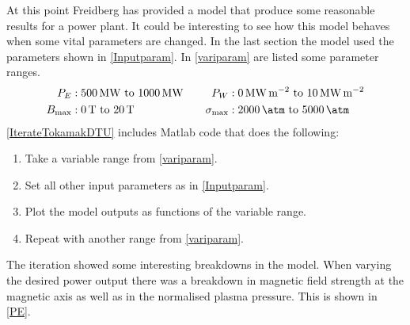 At this point Freidberg has provided a model that produce some reasonable results for a power plant. It could be interesting to see how this model behaves when some vital parameters are changed. In the last section the model used the parameters shown in \cref{Inputparam}. In \cref{variparam} are listed some parameter ranges.
\begin{alignat}{3}
	P_E &: \SIrange{500}{1000}{\mega\watt} & \quad P_W &: \SIrange{0}{10}{\mega\watt\per\meter\squared}\nonumber\\
	B_{\max} &: \SIrange{0}{20}{\tesla} & \quad \sigma_{\max} &: \SIrange{2000}{5000}{\atm}\label{variparam}
\end{alignat}
\cref{IterateTokamakDTU} includes Matlab code that does the following:
\begin{enumerate}
	\item Take a variable range from \cref{variparam}.
	\item Set all other input parameters as in \cref{Inputparam}.
	\item Plot the model outputs as functions of the variable range.
	\item Repeat with another range from \cref{variparam}.
\end{enumerate}
The iteration showed some interesting breakdowns in the model. When varying the desired power output there was a breakdown in magnetic field strength at the magnetic axis as well as in the normalised plasma pressure. This is shown in \cref{PE}.
